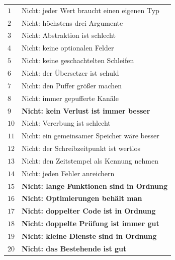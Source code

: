 \begin{merksatz}
\begin{center}
{\small
\renewcommand{\arraystretch}{1.32}
\begin{tabular}{@{}P{0.7cm}P{7.9cm}@{}}
\toprule
$1$ & Nicht: jeder Wert braucht einen eigenen Typ\\
$2$ & Nicht: höchstens drei Argumente\\
$3$ & Nicht: Abstraktion ist schlecht\\
$4$ & Nicht: keine optionalen Felder\\
$5$ & Nicht: keine geschachtelten Schleifen\\
$6$ & Nicht: der Übersetzer ist schuld\\
$7$ & Nicht: den Puffer größer machen\\
$8$ & Nicht: immer gepufferte Kanäle\\
$9$ & \textbf{Nicht: kein Verlust ist immer besser}\\
$10$ & Nicht: Vererbung ist schlecht\\
$11$ & Nicht: ein gemeinsamer Speicher wäre besser\\
$12$ & Nicht: der Schreibzeitpunkt ist wertlos\\
$13$ & Nicht: den Zeitstempel als Kennung nehmen\\
$14$ & Nicht: jeden Fehler anreichern\\
\midrule
$15$ & \textbf{Nicht: lange Funktionen sind in Ordnung}\\
$16$ & \textbf{Nicht: Optimierungen behält man}\\
$17$ & \textbf{Nicht: doppelter Code ist in Ordnung}\\
$18$ & \textbf{Nicht: doppelte Prüfung ist immer gut}\\
$19$ & \textbf{Nicht: kleine Dienste sind in Ordnung}\\
$20$ & \textbf{Nicht: das Bestehende ist gut}\\
\bottomrule
\end{tabular}}
\end{center}

\begin{center}
\begin{minipage}{0.88\textwidth}
\end{minipage}
\end{center}
\end{merksatz}

